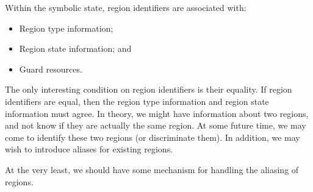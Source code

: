 \documentclass[a4paper]{article}
\begin{document}
Within the symbolic state, region identifiers are associated with:
\begin{itemize}
  \item Region type information;
  \item Region state information; and
  \item Guard resources.
\end{itemize}

The only interesting condition on region identifiers is their equality.
If region identifiers are equal, then the region type information and region state information must agree.
In theory, we might have information about two regions, and not know if they are actually the same region.
At some future time, we may come to identify these two regions (or discriminate them).
In addition, we may wish to introduce aliases for existing regions.

At the very least, we should have some mechanism for handling the aliasing of regions.
\end{document}
